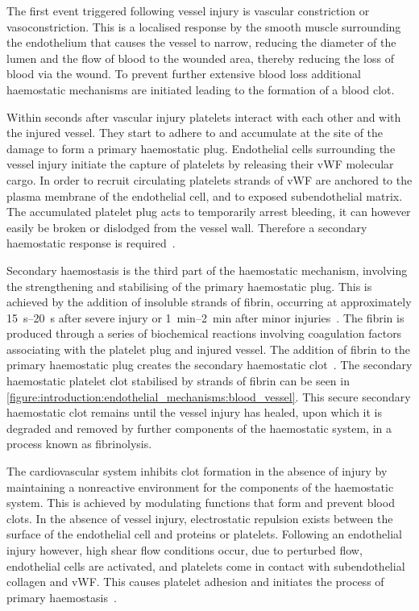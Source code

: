 The first event triggered following vessel injury is vascular constriction or vasoconstriction. This is a localised response by the smooth muscle surrounding the endothelium that causes the vessel to narrow, reducing the diameter of the lumen and the flow of blood to the wounded area, thereby reducing the loss of blood via the wound. To prevent further extensive blood loss additional haemostatic mechanisms are initiated leading to the formation of a blood clot.

Within seconds after vascular injury platelets interact with each other and with the injured vessel. They start to adhere to and accumulate at the site of the damage to form a primary haemostatic plug. Endothelial cells surrounding the vessel injury initiate the capture of platelets by releasing their vWF molecular cargo. In order to recruit circulating platelets strands of vWF are anchored to the plasma membrane of the endothelial cell, and to exposed subendothelial matrix. The accumulated platelet plug acts to temporarily arrest bleeding, it can however easily be broken or dislodged from the vessel wall. Therefore a secondary haemostatic response is required~\cite{Rasche2001}.

Secondary haemostasis is the third part of the haemostatic mechanism, involving the strengthening and stabilising of the primary haemostatic plug. This is achieved by the addition of insoluble strands of fibrin, occurring at approximately \SIrange{15}{20}{\second} after severe injury or \SIrange{1}{2}{\minute} after minor injuries~\cite{Hall2011}. The fibrin is produced through a series of biochemical reactions involving coagulation factors associating with the platelet plug and injured vessel. The addition of fibrin to the primary haemostatic plug creates the secondary haemostatic clot~\cite{Pocock2013}. The secondary haemostatic platelet clot stabilised by strands of fibrin can be seen in \autoref{figure:introduction:endothelial_mechanisms:blood_vessel}. This secure secondary haemostatic clot remains until the vessel injury has healed, upon which it is degraded and removed by further components of the haemostatic system, in a process known as fibrinolysis.

The cardiovascular system inhibits clot formation in the absence of injury by maintaining a nonreactive environment for the components of the haemostatic system. This is achieved by modulating functions that form and prevent blood clots. In the absence of vessel injury, electrostatic repulsion exists between the surface of the endothelial cell and proteins or platelets. Following an endothelial injury however, high shear flow conditions occur, due to perturbed flow, endothelial cells are activated, and platelets come in contact with subendothelial collagen and vWF. This causes platelet adhesion and initiates the process of primary haemostasis~\cite{Sumpio2002}.

